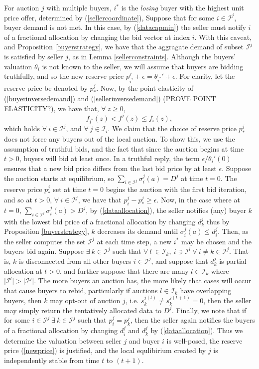 \documentclass[12pt]{article}
\theoremstyle{definition}
\newcommand{\mcI}{\mathcal{I}}
\newcommand{\g}{\sigma}
\begin{document}
\begin{multicols}{2}
For auction $j$ with multiple buyers, $i^*$ is the \emph{losing} buyer with the highest unit
price offer, determined by (\ref{sellercoordinate}), 
Suppose that for some $i\in\mcI^j$, buyer demand is not met. 
In this case, by (\ref{datacapmin}) the seller must notify $i$ of a
fractional allocation by changing the bid vector at index $i$.
With this caveat, and Proposition \ref{buyerstrategy}, we have that the
aggragate demand of subset $\mcI^j$ is satisfied by seller $j$, as in Lemma
\ref{sellerconstraints}.
Although the buyers' valuation $\theta_i$ is not known to the seller, we will assume
that buyers are bidding truthfully, and so the new reserve price $p_{i^*}^j +
\epsilon ={\theta_{i^*}}' + \epsilon$. For clarity, let the reserve price be denoted by
$p_*^j$.
Now, by the point elasticity of (\ref{buyerinversedemand}) and
(\ref{sellerinversedemand}) (PROVE POINT ELASTICITY?), we have that, $\forall \ z\ge 0$,
$$
    f_{i^*}(z) < f^j(z) \le f_i(z), 
$$
which holds $\forall \ i \in \mcI^j$, and $\forall \ j \in \mcI_i$.
We claim that the choice of reserve price $p_*^j$ does not force any buyers out
of the local auction. To show this, we use the assumption of truthful bids, and
the fact that since the auction begins at time $t>0$, buyers will
bid at least once. In a truthful reply, the term $\epsilon/\theta_i'(0)$
ensures that a new bid price differs from the last bid price by at least
$\epsilon$. Suppose the auction starts at equilibrium, so $\sum_{i\in\mcI^j}
\g_i^j(a) = D^j$ at time $t=0$. The reserve price $p_*^j$ set at time $t=0$
begins the auction with the first bid iteration, and so at $t>0$, $\forall \ i \in
\mcI^j$, we have that $p_i^j - p_*^j \ge \epsilon$.
Now, in the case where at $t=0$, $\sum_{i\in\mcI^j} \g_i^j(a) > D^j$, by
(\ref{dataallocation}), the seller notifies (any) buyer $k$ with the lowest bid price of a fractional allocation by changing
$d_k^j$ thus by Proposition \ref{buyerstrategy}, $k$ decreases its demand until
$\g_i^j(a) \le d_i^j$. Then, as the seller computes the set $\mcI^j$ at each time
step, a new $i^*$ may be chosen and the buyers bid again.
Suppose $\exists \ k \in \mcI^j$ such that $\forall \ l \ \in
\mcI_k, \ i\ni \mcI^l \ \forall \ i\ne k\in\mcI^j$. That is, $k$ is
disconnected from all other buyers $i\in\mcI^j$, and suppose that $d_k^j$
is partial allocation at $t>0$, and further suppose that there are many
$l\in\mcI_k$ where $\vert \mcI^l\vert > \vert\mcI^j\vert$. The more buyers an
auction has, the more likely that cases will occur that cause buyers to rebid,
particularly if auctions $l\in\mcI_k$ have overlapping buyers, then $k$ may
opt-out of auction $j$, i.e. $s_k^{j(t)} \ne s_k^{j(t+1)} =
0$, then the seller may simply return the tentatively allocated data to $D^j$.
Finally, we note that if for some $i\in\mcI^j \ \exists \ k\in\mcI^j$
such that $p_{i}^j = p_k^j$, then the seller again notifies the buyers of a fractional
allocation by changing $d_i^j$ and $d_k^j$ by (\ref{dataallocation}).
Thus we determine the valuation between seller
$j$ and buyer $i$ is well-posed, the reserve price (\ref{newprice}) is justified, and the local
equlibirium created by $j$ is independently stable from time $t$ to $(t+1)$. 


\end{multicols}
\end{document}
